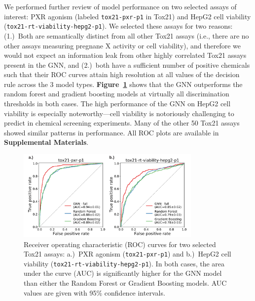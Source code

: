 \documentclass{ws-procs11x85}
\begin{document}
We performed further review of model performance on two selected assays of interest: PXR agonism (labeled \texttt{tox21-pxr-p1} in Tox21) and HepG2 cell viability (\texttt{tox21-rt-viability-hepg2-p1}).
We selected these assays for two reasons: (1.)~Both are semantically distinct from all other Tox21 assays (i.e., there are no other assays measuring pregnane X activity or cell viability), and therefore we would not expect an information leak from other highly correlated Tox21 assays present in the GNN, and (2.)~both have a sufficient number of positive chemicals such that their ROC curves attain high resolution at all values of the decision rule across the 3 model types.
\textbf{Figure~\ref{fig:4}} shows that the GNN outperforms the random forest and gradient boosting models at virtually all discrimination thresholds in both cases. 
The high performance of the GNN on HepG2 cell viability is especially noteworthy---cell viability is notoriously challenging to predict in chemical screening experiments.
Many of the other 50 Tox21 assays showed similar patterns in performance.
All ROC plots are available in \textbf{Supplemental Materials}.

\begin{figure}
   \centering
   \includegraphics[width=0.8\textwidth]{figures/figure4.pdf}
   \caption{Receiver operating characteristic (ROC) curves for two selected Tox21 assays: a.)~PXR agonism (\texttt{tox21-pxr-p1}) and b.)~HepG2 cell viability (\texttt{tox21-rt-viability-hepg2-p1}). In both cases, the area under the curve (AUC) is significantly higher for the GNN model than either the Random Forest or Gradient Boosting models. AUC values are given with 95\% confidence intervals.}\label{fig:4}
\end{figure}
\end{document}
